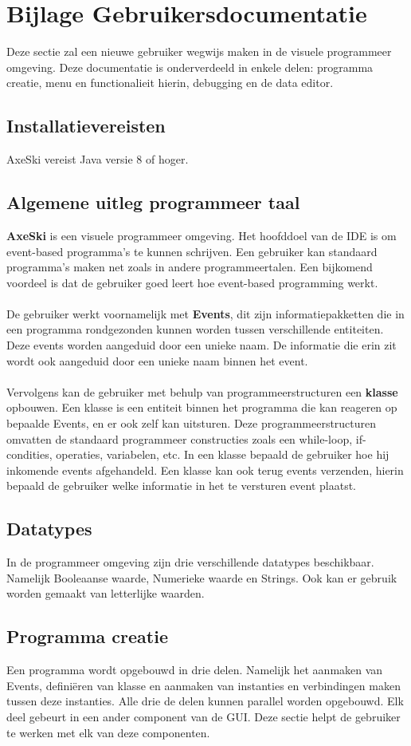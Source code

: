\documentclass[]{article}
\begin{document}
\section{Bijlage Gebruikersdocumentatie}
Deze sectie zal een nieuwe gebruiker wegwijs maken in de visuele programmeer omgeving. Deze documentatie is onderverdeeld in enkele delen: programma creatie, menu en functionalieit hierin, debugging en de data editor.
\subsection{Installatievereisten}
AxeSki vereist Java versie 8 of hoger.
\subsection{Algemene uitleg programmeer taal}
\textbf{AxeSki} is een visuele programmeer omgeving. Het hoofddoel van de IDE is om event-based programma's te kunnen schrijven. Een gebruiker kan standaard programma's maken net zoals in andere programmeertalen. Een bijkomend voordeel is dat de gebruiker goed leert hoe event-based programming werkt.\\\\
De gebruiker werkt voornamelijk met \textbf{Events}, dit zijn informatiepakketten die in een programma rondgezonden kunnen worden tussen verschillende entiteiten. Deze events worden aangeduid door een unieke naam. De informatie die erin zit wordt ook aangeduid door een unieke naam binnen het event. \\\\
Vervolgens kan de gebruiker met behulp van programmeerstructuren een \textbf{klasse} opbouwen. Een klasse is een entiteit binnen het programma die kan reageren op bepaalde Events, en er ook zelf kan uitsturen. Deze programmeerstructuren omvatten de standaard programmeer constructies zoals een while-loop, if-condities, operaties, variabelen, etc. In een klasse bepaald de gebruiker hoe hij inkomende events afgehandeld. Een klasse kan ook terug events verzenden, hierin bepaald de gebruiker welke informatie in het te versturen event plaatst.

\subsection{Datatypes}
In de programmeer omgeving zijn drie verschillende datatypes beschikbaar. Namelijk Booleaanse waarde, Numerieke waarde en Strings. Ook kan er gebruik worden gemaakt van letterlijke waarden. 
\subsection{Programma creatie}
Een programma wordt opgebouwd in drie delen. Namelijk het aanmaken van Events, defini\"{e}ren van klasse en aanmaken van instanties en verbindingen maken tussen deze instanties. Alle drie de delen kunnen parallel worden opgebouwd. Elk deel gebeurt in een ander component van de GUI. Deze sectie helpt de gebruiker te werken met elk van deze componenten.
\end{document}
